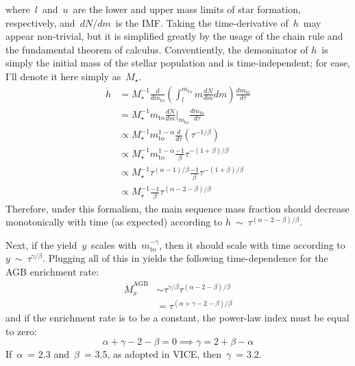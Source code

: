 \documentclass[12pt]{report}
\begin{document}
where~$l$~and~$u$~are the lower and upper mass limits of star formation, 
respectively, and~$dN/dm$~is the IMF. Taking the time-derivative of~$h$~may 
appear non-trivial, but it is simplified greatly by the usage of the chain 
rule and the fundamental theorem of calculus. Conventiently, the demoninator of 
$h$~is simply the initial mass of the stellar population and is 
time-independent; for ease, I'll denote it here simply as~$M_\star$. 
\begin{subequations}\begin{align} 
\dot{h} &= M_\star^{-1} \frac{d}{dm_\text{to}} 
\left(\int_l^{m_\text{to}} m\frac{dN}{dm} dm\right) 
\frac{dm_\text{to}}{d\tau} 
\\ 
&= M_\star^{-1} m_\text{to} \frac{dN}{dm}\Big|_{m_\text{to}} 
\frac{dm_\text{to}}{d\tau} 
\\ 
&\propto M_\star^{-1} m_\text{to}^{1 - \alpha} \frac{d}{d\tau}(\tau^{-1/\beta}) 
\\ 
&\propto M_\star^{-1} m_\text{to}^{1 - \alpha} \frac{-1}{\beta} 
\tau^{-(1 + \beta)/\beta} 
\\ 
&\propto M_\star^{-1} \tau^{(\alpha - 1) / \beta} \frac{-1}{\beta} 
\tau^{-(1 + \beta)/\beta} 
\\ 
&\propto M_\star^{-1} \frac{-1}{\beta} \tau^{(\alpha - 2 - \beta)/\beta} 
\end{align}\end{subequations} 
Therefore, under this formalism, the main sequence mass fraction should 
decrease monotonically with time (as expected) according to 
$\dot{h}~\sim~\tau^{(\alpha - 2 - \beta) / \beta}$. 
\par 
Next, if the yield~$y$~scales with~$m_\text{to}^{-\gamma}$, then it should 
scale with time according to~$y~\sim~\tau^{\gamma/\beta}$. Plugging all of this 
in yields the following time-dependence for the AGB enrichment rate: 
\begin{subequations}\begin{align} 
\dot{M}_x^\text{AGB} &\sim \tau^{\gamma/\beta} 
\tau^{(\alpha - 2 - \beta) / \beta} 
\\ 
&= \tau^{(\alpha + \gamma - 2 - \beta) / \beta} 
\end{align}\end{subequations} 
and if the enrichment rate is to be a constant, the power-law index must be 
equal to zero: 
\begin{equation} 
\alpha + \gamma - 2 - \beta = 0 \implies \gamma = 2 + \beta - \alpha 
\end{equation} 
If~$\alpha$~= 2.3 and~$\beta$~= 3.5, as adopted in VICE, then~$\gamma$~= 3.2. 
\end{document}
